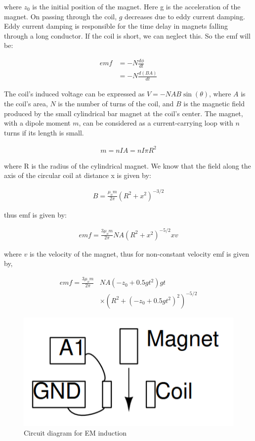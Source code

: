     where $z_0$ is the initial position of the magnet. Here g is the acceleration of the magnet. On passing through the coil, $g$ decreases due to eddy current damping. Eddy current damping is responsible for the time delay in magnets falling through a long conductor. If the coil is short, we can neglect this. So the emf will be:

    \begin{align*}
        emf&=-N\frac{d\phi}{dt}\\&=-N\frac{d(BA)}{dt}
    \end{align*}


    The coil's induced voltage can be expressed as $V = -NAB\sin(\theta)$, where $A$ is the coil's area, $N$ is the number of turns of the coil, and $B$ is the magnetic field produced by the small cylindrical bar magnet at the coil's center. The magnet, with a dipole moment $m$, can be considered as a current-carrying loop with $n$ turns if its length is small.

    \begin{align*}m = n I A = n I\pi R^2\end{align*}

    where R is the radius of the cylindrical magnet. We know that the field along the axis of the circular coil at distance x is given by:

    \begin{align*}B=\frac{\mu_o m}{2\pi}(R^2+x^2)^{-3/2}\end{align*}

    thus emf is given by:

    \begin{align*}emf=\frac{3\mu_o m}{2\pi}NA(R^2+x^2)^{-5/2}xv\end{align*}

    where $v$ is the velocity of the magnet, thus for non-constant velocity emf is given by,

    \begin{equation}
        \begin{split}
            emf=\frac{3\mu_o m}{2\pi}&NA(-z_0+ 0.5gt^2)gt\\
            &\times(R^2+(-z_0+ 0.5gt^2)^2)^{-5/2}
        \end{split}
        \label{eq:4}
    \end{equation}

    \begin{figure}[h]
        \centering
        \includegraphics[width=0.5\columnwidth]{images/induc.png}
        \caption{Circuit diagram for EM induction}
        \label{th:6.5}
    \end{figure}

